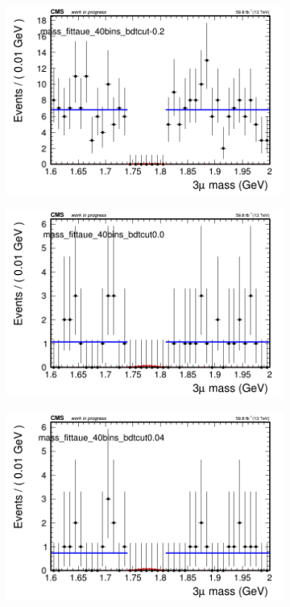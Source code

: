 \begin{figure}[H]
\begin{subfigure}{0.2\textwidth}
        \caption{}
    \end{subfigure}
    \begin{subfigure}{0.2\textwidth}
        \includegraphics[width=\textwidth]{flat_fit/plots/taue/massfit_taue_40bins_bdtcut-0.2.png}
        \caption{}
    \end{subfigure}
    \begin{subfigure}{0.2\textwidth}
        \includegraphics[width=\textwidth]{flat_fit/plots/taue/massfit_taue_40bins_bdtcut0.0.png}
        \caption{}
    \end{subfigure}
    \begin{subfigure}{0.2\textwidth}
        \includegraphics[width=\textwidth]{flat_fit/plots/taue/massfit_taue_40bins_bdtcut0.04.png}

\end{subfigure}
\end{figure}
